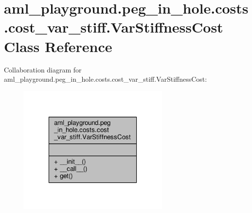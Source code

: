 \hypertarget{classaml__playground_1_1peg__in__hole_1_1costs_1_1cost__var__stiff_1_1_var_stiffness_cost}{\section{aml\-\_\-playground.\-peg\-\_\-in\-\_\-hole.\-costs.\-cost\-\_\-var\-\_\-stiff.\-Var\-Stiffness\-Cost Class Reference}
\label{classaml__playground_1_1peg__in__hole_1_1costs_1_1cost__var__stiff_1_1_var_stiffness_cost}
}


Collaboration diagram for aml\-\_\-playground.\-peg\-\_\-in\-\_\-hole.\-costs.\-cost\-\_\-var\-\_\-stiff.\-Var\-Stiffness\-Cost\-:\nopagebreak
\begin{figure}[H]
\begin{center}
\leavevmode
\includegraphics[width=214pt]{classaml__playground_1_1peg__in__hole_1_1costs_1_1cost__var__stiff_1_1_var_stiffness_cost__coll__graph}
\end{center}
\end{figure}

